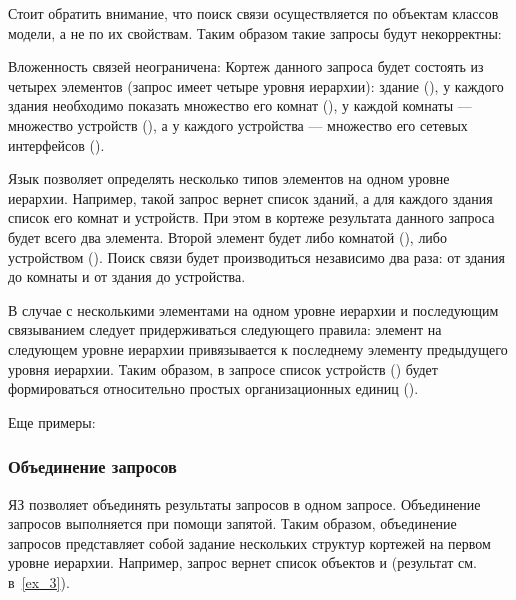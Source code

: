 Стоит обратить внимание, что поиск связи осуществляется по объектам классов модели, 
а не по их свойствам. Таким образом такие запросы будут некорректны:


Вложенность связей неограничена:
Кортеж данного запроса будет состоять из четырех элементов (запрос имеет четыре уровня иерархии): 
здание (), у каждого здания необходимо показать множество его комнат (), 
у каждой комнаты --- множество устройств (), 
а у каждого устройства --- множество его сетевых интерфейсов ().

Язык позволяет определять несколько типов элементов на одном уровне иерархии. Например,
такой запрос
вернет список зданий, а для каждого здания список его комнат и устройств. При этом
в кортеже результата данного запроса будет всего два элемента. Второй элемент будет
либо комнатой (), либо устройством (). Поиск связи будет производиться
независимо два раза: от здания до комнаты и от здания до устройства.

В случае с несколькими элементами на одном уровне иерархии и последующим связыванием
следует придерживаться следующего правила: элемент на следующем уровне иерархии 
привязывается к последнему элементу предыдущего уровня иерархии. Таким образом,
в запросе
список устройств () будет формироваться относительно простых
организационных единиц ().

Еще примеры:




\subsubsection{Объединение запросов}
ЯЗ позволяет объединять результаты запросов в одном запросе. Объединение запросов 
выполняется при помощи запятой. Таким образом, объединение запросов представляет
собой задание нескольких структур кортежей на первом уровне иерархии. Например, запрос
вернет список объектов  и  (результат см. в~\ref{ex_3}). 

